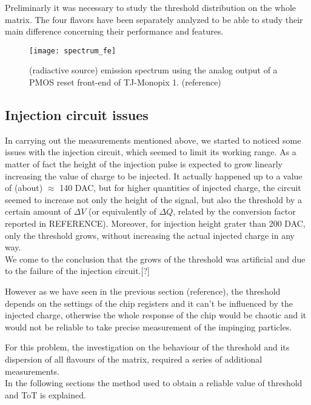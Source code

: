 Preliminarly it was necessary to study the threshold distribution on the whole matrix. The four flavors have been separately analyzed to be able to study their main difference concerning their performance and features.

\begin{figure}[h!]
\centering
\texttt{[image: spectrum\_fe]}
\caption{ (radiactive source) emission spectrum using the analog output of a PMOS reset front-end of TJ-Monopix 1. (reference)}
\label{fig:fespectrum}
\end{figure}

\subsection{Injection circuit issues}

In carrying out the measurements mentioned above, we started to noticed some issues with the injection circuit, which seemed to limit its working range. As a matter of fact the height of the injection pulse is expected to grow linearly increasing the value of charge to be injected.
It actually happened up to a value of (about) $\approx$ 140 DAC, but for higher quantities of injected charge, the circuit seemed to increase not only the height of the signal, but also the threshold by a certain amount of $\Delta V$ (or equivalently of $\Delta Q$, related by the conversion factor reported in REFERENCE). Moreover, for injection height grater than 200 DAC, only the threshold grows, without increasing the actual injected charge in any way.\\
We come to the conclusion that the grows of the threshold was artificial and due to the failure of the injection circuit.[?]

However as we have seen in the previous section (reference), the threshold depends on the settings of the chip registers and it can't be influenced by the injected charge, otherwise the whole response of the chip would be chaotic and it would not be reliable to take precise measurement of the impinging particles. 

For this problem, the investigation on the behaviour of the threshold and its dispersion of all flavours of the matrix, required a series of additional measurements.\\
In the following sections the method used to obtain a reliable value of threshold and ToT is explained.

